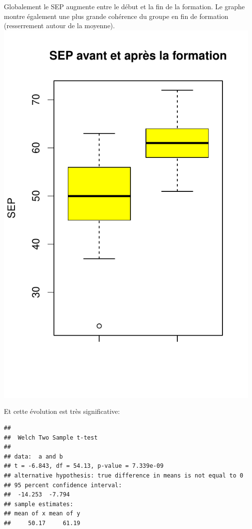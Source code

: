 \documentclass[12pt,english,french]{article}\usepackage{graphicx, color}
\makeatletter
\def\maxwidth{ %
  \ifdim\Gin@nat@width>\linewidth
    \linewidth
  \else
    \Gin@nat@width
  \fi
}
\newenvironment{kframe}{%
 \def\at@end@of@kframe{}%
 \ifinner\ifhmode%
  \def\at@end@of@kframe{\end{minipage}}%
  \begin{minipage}{\columnwidth}%
 \fi\fi%
 \def\FrameCommand##1{\hskip\@totalleftmargin \hskip-\fboxsep
 \colorbox{shadecolor}{##1}\hskip-\fboxsep
     \hskip-\linewidth \hskip-\@totalleftmargin \hskip\columnwidth}%
 \MakeFramed {\advance\hsize-\width
   \@totalleftmargin\z@ \linewidth\hsize
   \@setminipage}}%
 {\par\unskip\endMakeFramed%
 \at@end@of@kframe}
\newenvironment{knitrout}{}{} %
\makeatother
\begin{document}
Globalement le SEP augmente entre le début et la fin de la formation. Le graphe montre également une plus grande cohérence du groupe en fin de formation (resserrement autour de la moyenne).
\begin{knitrout}
\color{fgcolor}
\includegraphics[width=\maxwidth]{figure/sepboxplot} 

\end{knitrout}

Et cette évolution est très significative:
\begin{knitrout}
\color{fgcolor}\begin{kframe}
\begin{verbatim}
## 
## 	Welch Two Sample t-test
## 
## data:  a and b 
## t = -6.843, df = 54.13, p-value = 7.339e-09
## alternative hypothesis: true difference in means is not equal to 0 
## 95 percent confidence interval:
##  -14.253  -7.794 
## sample estimates:
## mean of x mean of y 
##     50.17     61.19
\end{verbatim}
\end{kframe}
\end{knitrout}
\end{document}
